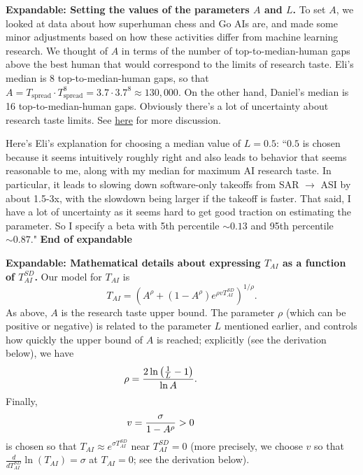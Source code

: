\documentclass{article}
\theoremstyle{definition}
\begin{document}
\textbf{Expandable: Setting the values of the parameters $A$ and $L$.} To set $A$, we looked at data about how superhuman chess and Go AIs are, and made some minor adjustments based on how these activities differ from machine learning research. We thought of $A$ in terms of the number of top-to-median-human gaps above the best human that would correspond to the limits of research taste. Eli's median is 8 top-to-median-human gaps, so that $A = T_\text{spread} \cdot T_\text{spread}^8 = 3.7 \cdot 3.7^8 \approx 130,000$. On the other hand, Daniel's median is 16 top-to-median-human gaps. Obviously there's a lot of uncertainty about research taste limits. See \href{https://docs.google.com/document/d/1ru6Okbxb6XuH18Cz8439sdQJazMV39hNxsWDokh97r0/edit?tab=t.0#bookmark=kix.2rf7ntzlzkj}{here} for more discussion.

Here's Eli's explanation for choosing a median value of $L = 0.5$: ``$0.5$ is chosen because it seems intuitively roughly right and also leads to behavior that seems reasonable to me, along with my median for maximum AI research taste. In particular, it leads to slowing down software-only takeoffs from SAR $\rightarrow$ ASI by about 1.5-3x, with the slowdown being larger if the takeoff is faster. That said, I have a lot of uncertainty as it seems hard to get good traction on estimating the parameter. So I specify a beta with 5th percentile $\sim 0.13$ and 95th percentile $\sim 0.87$." \textbf{End of expandable}

\label{Math details of automated research taste}

\textbf{Expandable: Mathematical details about expressing $T_{AI}$ as a function of $T_{AI}^{SD}$.}
Our model for $T_{AI}$ is
\[ T_{AI} = \left( A^\rho + (1-A^\rho) e^{\rho v T_{AI}^{SD}}\right)^{1/\rho}.\]
As above, $A$ is the research taste upper bound. The parameter $\rho$ (which can be positive or negative) is related to the parameter $L$ mentioned earlier, and controls how quickly the upper bound of $A$ is reached; explicitly (see the derivation below), we have
\begin{equation} \label{rho}
\rho = \frac{2 \ln\left(\frac{1}{L}-1\right)}{\ln A}. \hspace*{1.5cm}
\end{equation}
Finally,
\begin{equation} \label{v}
v = \frac{\sigma}{1-A^\rho} > 0 \hspace*{1.5cm}
\end{equation}
is chosen so that $T_{AI} \approx e^{\sigma T_{AI}^{SD}}$ near $T_{AI}^{SD} = 0$ (more precisely, we choose $v$ so that $\frac{d}{d T_{AI}^{SD}}\ln(T_{AI}) = \sigma$ at $T_{AI} = 0$; see the derivation below).
\end{document}
